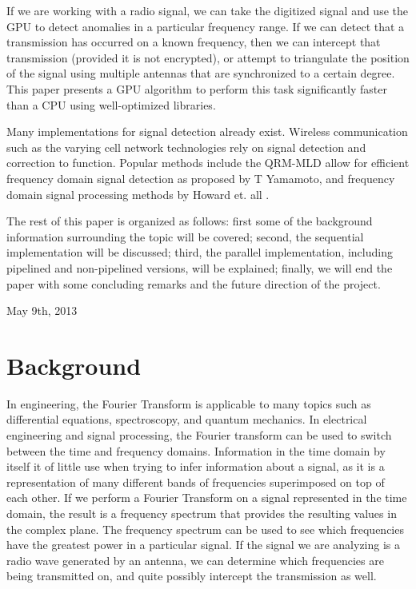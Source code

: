 \documentclass[conference]{IEEEtran}
\begin{document}
If we are working with a radio signal, we can take the digitized signal and
use the GPU to detect anomalies in a particular frequency range. If we can
detect that a transmission has occurred on a known frequency, then we can
intercept that transmission (provided it is not encrypted), or attempt
to triangulate the position of the signal using multiple antennas that
are synchronized to a certain degree. This paper presents a GPU algorithm
to perform this task significantly faster than a CPU using well-optimized
libraries.

Many implementations for signal detection already exist. Wireless 
communication such as the varying cell network technologies rely on signal
detection and correction to function. Popular methods include the QRM-MLD 
allow for efficient frequency domain signal detection as proposed by 
T Yamamoto\cite{yamamoto}, and frequency domain signal processing methods
by Howard et. all \cite{howard}.

The rest of this paper is organized as follows: first some of the background
information surrounding the topic will be covered; second, the sequential implementation
will be discussed; third, the parallel implementation, including pipelined and
non-pipelined versions, will be explained; finally, we will end the paper
with some concluding remarks and the future direction of the project.
 
\hfill May 9th, 2013

\section{Background}

In engineering, the Fourier Transform is applicable to many topics such as 
differential equations, spectroscopy, and quantum mechanics. In electrical
engineering and signal processing, the Fourier transform can be used to
switch between the time and frequency domains. Information in the time
domain by itself it of little use when trying to infer information about
a signal, as it is a representation of many different bands of frequencies
superimposed on top of each other. If we perform a Fourier Transform on 
a signal represented in the time domain, the result is a frequency spectrum
that provides the resulting values in the complex plane. The frequency
spectrum can be used to see which frequencies have the greatest power
in a particular signal. If the signal we are analyzing is a radio wave
generated by an antenna, we can determine which frequencies are being
transmitted on, and quite possibly intercept the transmission as well.
\end{document}
